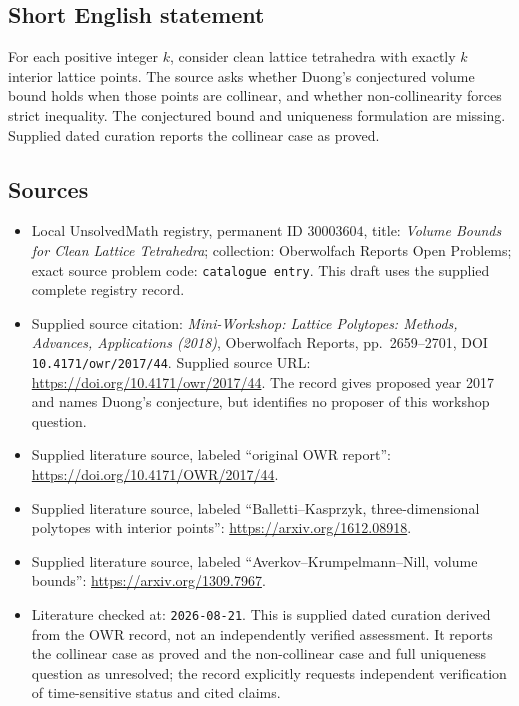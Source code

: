 \documentclass[11pt]{article}
\begin{document}
\subsection{Short English statement}
For each positive integer \(k\), consider clean lattice tetrahedra with exactly \(k\) interior lattice points. The source asks whether Duong's conjectured volume bound holds when those points are collinear, and whether non-collinearity forces strict inequality. The conjectured bound and uniqueness formulation are missing. Supplied dated curation reports the collinear case as proved.
\subsection{Sources}
\begin{itemize}
\item Local UnsolvedMath registry, permanent ID \(30003604\), title: \emph{Volume Bounds for Clean Lattice Tetrahedra}; collection: Oberwolfach Reports Open Problems; exact source problem code: \texttt{catalogue entry}. This draft uses the supplied complete registry record.
\item Supplied source citation: \emph{Mini-Workshop: Lattice Polytopes: Methods, Advances, Applications (2018)}, Oberwolfach Reports, pp.\ 2659--2701, DOI \texttt{10.4171/owr/2017/44}. Supplied source URL: \url{https://doi.org/10.4171/owr/2017/44}. The record gives proposed year 2017 and names Duong's conjecture, but identifies no proposer of this workshop question.
\item Supplied literature source, labeled ``original OWR report'': \url{https://doi.org/10.4171/OWR/2017/44}.
\item Supplied literature source, labeled ``Balletti--Kasprzyk, three-dimensional polytopes with interior points'': \url{https://arxiv.org/1612.08918}.
\item Supplied literature source, labeled ``Averkov--Krumpelmann--Nill, volume bounds'': \url{https://arxiv.org/1309.7967}.
\item Literature checked at: \texttt{2026-08-21}. This is supplied dated curation derived from the OWR record, not an independently verified assessment. It reports the collinear case as proved and the non-collinear case and full uniqueness question as unresolved; the record explicitly requests independent verification of time-sensitive status and cited claims.
\end{itemize}
\end{document}
